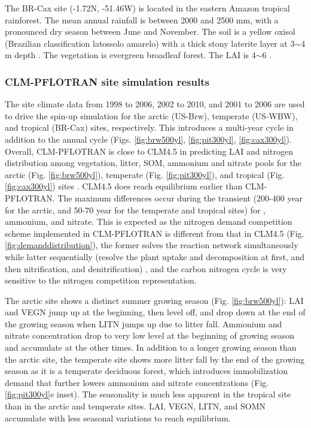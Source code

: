 \documentclass[gmd, manuscript]{copernicus}
\begin{document}
The BR-Cax site (-1.72N, -51.46W) is located in the eastern Amazon tropical
rainforest. The mean annual rainfall is between 2000 and 2500 \unit{mm}, with a
pronounced dry season between June and November. The soil is a yellow oxisol
(Brazilian classification latossolo amarelo) with a thick stony laterite layer
at 3$\sim$4 m depth \citep{daCosta2010}. The vegetation is evergreen
broadleaf forest. The LAI is 4$\sim$6 \citep{Powell2013}. 

\subsubsection{CLM-PFLOTRAN site simulation results}
The site climate data from 1998 to 2006, 2002 to
2010, and 2001 to 2006  are used to drive the spin-up simulation for the arctic (US-Brw),
temperate (US-WBW), and tropical (BR-Cax) sites, respectively. This introduces a multi-year cycle
in addition to the annual cycle (Figs. \ref{fig:brw500yl}, \ref{fig:pit300yl},
\ref{fig:cax300yl}). Overall, CLM-PFLOTRAN is close to CLM4.5 in
predicting LAI and nitrogen distribution among vegetation, litter, SOM,
ammonium and nitrate pools for the arctic (Fig. \ref{fig:brw500yl}),
temperate (Fig. \ref{fig:pit300yl}), and tropical (Fig. \ref{fig:cax300yl}) sites .
CLM4.5 does reach equilibrium earlier than CLM-PFLOTRAN. The maximum differences occur during the transient (200-400 year for the arctic, and 50-70 year for the temperate and tropical sites) for , ammonium, and
nitrate. This is expected as the nitrogen demand competition scheme implemented in CLM-PFLOTRAN is
different from that in CLM4.5 (Fig. \ref{fig:demanddistribution}), the former solves the reaction network simultaneously while latter sequentially (resolve the plant uptake and decomposition at first, and then nitrification, and denitrification) , and the carbon nitrogen cycle is very sensitive to the nitrogen competition representation. 

The arctic site shows a distinct summer growing season (Fig.
\ref{fig:brw500yl}): LAI and VEGN jump up at the beginning, then level off, and
drop down at the end of the growing season when LITN jumps up due to litter fall.
Ammonium and nitrate concentration drop to very low level at the beginning of
growing season and accumulate at the other times. In addition to a longer growing
season than the arctic site, the temperate site shows more litter fall by the
end of the growing season as it is a temperate deciduous forest, which introduces
immobilization demand that further lowers ammonium and nitrate
concentrations (Fig. \ref{fig:pit300yl}e inset). The seasonality is much less
apparent in the tropical site than in the arctic and temperate sites. LAI,
VEGN, LITN, and SOMN accumulate with less seasonal variations to reach 
equilibrium. 
\end{document}
